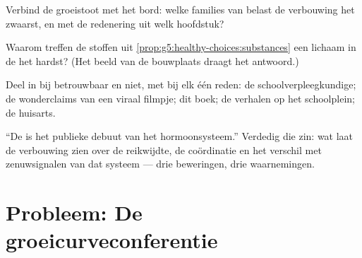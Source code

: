 \begin{exercise}[$\star\star$]\label{exo:g8:puberty:9}
Verbind de groeistoot met het bord: welke families van 
belast de verbouwing het zwaarst, en met de redenering uit welk hoofdstuk?
\end{exercise}

\begin{exercise}[$\star\star$]\label{exo:g8:puberty:10}
Waarom treffen de stoffen uit \cref{prop:g5:healthy-choices:substances}
een lichaam in de  het hardst? (Het beeld van de bouwplaats draagt
het antwoord.)
\end{exercise}

\begin{exercise}[$\star\star$]\label{exo:g8:puberty:11}
Deel in bij betrouwbaar en niet, met bij elk één reden: de
schoolverpleegkundige; de wonderclaims van een viraal filmpje; dit boek;
de verhalen op het schoolplein; de huisarts.
\end{exercise}

\begin{exercise}[$\star\star\star$]\label{exo:g8:puberty:12}
``De  is het publieke debuut van het hormoonsysteem.'' Verdedig
die zin: wat laat de verbouwing zien over de reikwijdte, de coördinatie en
het verschil met zenuwsignalen van dat systeem --- drie beweringen, drie
waarnemingen.
\end{exercise}

\section{Probleem: De groeicurveconferentie}

